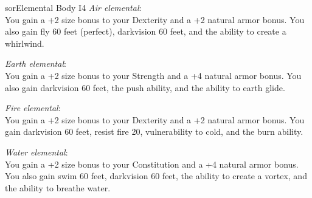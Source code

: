 \begin{spellcard}{sor}{Elemental Body I}{4}
  \vfill{}
  \emph{Air elemental}:\\
  You gain a +2 size bonus to your Dexterity and a +2 natural armor bonus.
  You also gain fly 60 feet (perfect), darkvision 60 feet, and the ability to create a whirlwind.

  \emph{Earth elemental}:\\
  You gain a +2 size bonus to your Strength and a +4 natural armor bonus.
  You also gain darkvision 60 feet, the push ability, and the ability to earth glide.

  \emph{Fire elemental}:\\
  You gain a +2 size bonus to your Dexterity and a +2 natural armor bonus.
  You gain darkvision 60 feet, resist fire 20, vulnerability to cold, and the burn ability.

  \emph{Water elemental}:\\
  You gain a +2 size bonus to your Constitution and a +4 natural armor bonus.
  You also gain swim 60 feet, darkvision 60 feet, the ability to create a vortex, and the ability to breathe water.
  \vfill{}
\end{spellcard}
